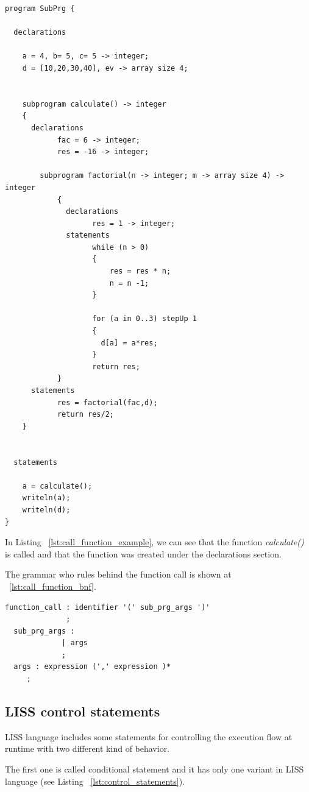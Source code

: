 \documentclass[
  oneside,
  11pt, a4paper,
  footinclude=true,
  headinclude=true,
  cleardoublepage=empty
]{scrbook}
\begin{document}
\begin{lstlisting}[caption={Example of call function in LISS},label={lst:call_function_example}]
 program SubPrg {

  declarations

    a = 4, b= 5, c= 5 -> integer;
    d = [10,20,30,40], ev -> array size 4;


    subprogram calculate() -> integer
    {
      declarations
            fac = 6 -> integer;
            res = -16 -> integer;

        subprogram factorial(n -> integer; m -> array size 4) -> integer
            {
              declarations
                    res = 1 -> integer;
              statements
                    while (n > 0)
                    {
                        res = res * n;
                        n = n -1;
                    }

                    for (a in 0..3) stepUp 1
                    {
                      d[a] = a*res;
                    }
                    return res;
            }
      statements
            res = factorial(fac,d);
            return res/2;
    }


  statements

    a = calculate();
    writeln(a);
    writeln(d);
}
\end{lstlisting}

In Listing ~\ref{lst:call_function_example}, we can see that the function \textit{calculate()} is called and that the function was created under the declarations section.

The grammar who rules behind the function call is shown at ~\ref{lst:call_function_bnf}.

\begin{lstlisting}[caption={BNF of call function in LISS},label={lst:call_function_bnf}]
  function_call : identifier '(' sub_prg_args ')'
              ;
  sub_prg_args :
             | args
             ;
  args : expression (',' expression )*
     ;

\end{lstlisting}

\subsection{LISS control statements}

LISS language includes some statements for controlling the execution flow at runtime with two different kind of behavior.

The first one is called conditional statement and it has only one variant in LISS language (see Listing ~\ref{lst:control_statements}).
\end{document}
